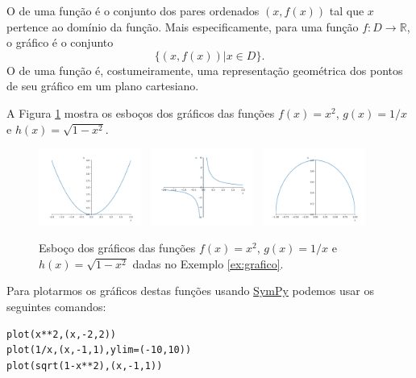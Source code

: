 O  de uma função é o conjunto dos pares ordenados $(x, f(x))$ tal que $x$ pertence ao domínio da função. Mais especificamente, para uma função $f:D\to \mathbb{R}$, o gráfico é o conjunto
\begin{equation}
  \{(x, f(x))| x\in D\}.
\end{equation}
O  de uma função é, costumeiramente, uma representação geométrica dos pontos de seu gráfico em um plano cartesiano.

\begin{ex}\label{ex:grafico}
  A Figura \ref{fig:ex_grafico} mostra os esboços dos gráficos das funções $f(x)=x^2$, $g(x)=1/x$ e $h(x)=\sqrt{1-x^2}$.
  
  \begin{figure}[H]
    \centering
    \includegraphics[width=0.3\textwidth]{./cap_funcao/dados/fig_ex_grafico/fig_ex_grafico_x2}~
    \includegraphics[width=0.3\textwidth]{./cap_funcao/dados/fig_ex_grafico/fig_ex_grafico_1x}~
    \includegraphics[width=0.3\textwidth]{./cap_funcao/dados/fig_ex_grafico/fig_ex_grafico_s1x2}
    \caption{Esboço dos gráficos das funções $f(x)=x^2$, $g(x)=1/x$ e $h(x)=\sqrt{1-x^2}$ dadas no Exemplo \ref{ex:grafico}.}
    \label{fig:ex_grafico}
  \end{figure}

  \ifispython
  Para plotarmos os gráficos destas funções usando \href{https://www.sympy.org}{SymPy} podemos usar os seguintes comandos:
\begin{verbatim}
plot(x**2,(x,-2,2))
plot(1/x,(x,-1,1),ylim=(-10,10))
plot(sqrt(1-x**2),(x,-1,1))
\end{verbatim}
  \fi
\end{ex}

